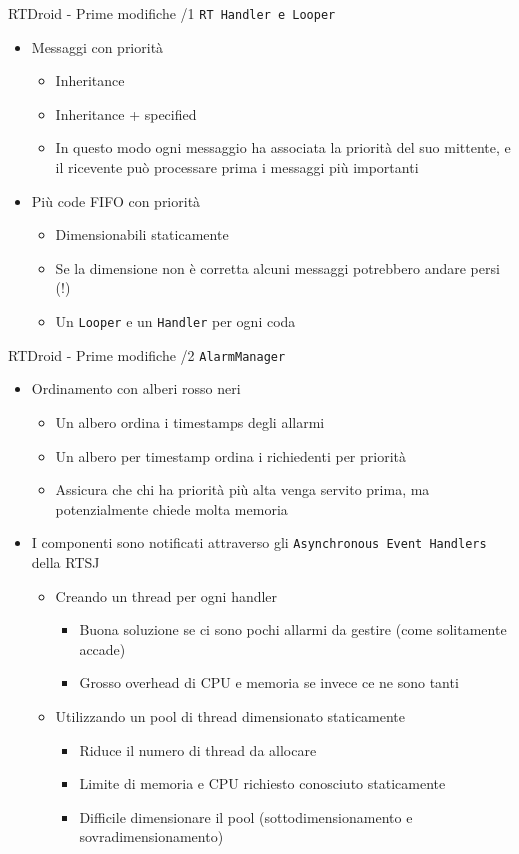 \begin{frame}{RTDroid - Prime modifiche /1}
	\texttt{RT Handler e Looper}
	\begin{itemize}
		\item Messaggi con priorità
		\begin{itemize}
			\item Inheritance
			\item Inheritance + specified
			\item In questo modo ogni messaggio ha associata la priorità del suo mittente, e il ricevente può processare prima i messaggi più importanti
		\end{itemize}
		\item Più code FIFO con priorità
		\begin{itemize}
			\item Dimensionabili staticamente 
			\item Se la dimensione non è corretta alcuni messaggi potrebbero andare persi (!)
			\item Un \texttt{Looper} e un \texttt{Handler} per ogni coda
		\end{itemize}
	\end{itemize}
\end{frame}
\begin{frame}{RTDroid - Prime modifiche /2}
	\texttt{AlarmManager}
	\begin{itemize}
		\item Ordinamento con alberi rosso neri
		\begin{itemize}
			\item Un albero ordina i timestamps degli allarmi
			\item Un albero per timestamp ordina i richiedenti per priorità
			\item Assicura che chi ha priorità più alta venga servito prima, ma potenzialmente chiede molta memoria
		\end{itemize}
		\item I componenti sono notificati attraverso gli \texttt{Asynchronous Event Handlers} della RTSJ
		\begin{itemize}
			\item Creando un thread per ogni handler
			\begin{itemize}
				\item Buona soluzione se ci sono pochi allarmi da gestire (come solitamente accade)
				\item Grosso overhead di CPU e memoria se invece ce ne sono tanti
			\end{itemize}
			\item Utilizzando un pool di thread dimensionato staticamente
			\begin{itemize}
				\item Riduce il numero di thread da allocare
				\item Limite di memoria e CPU richiesto conosciuto staticamente
				\item Difficile dimensionare il pool (sottodimensionamento e sovradimensionamento)
			\end{itemize}
		\end{itemize}
	\end{itemize}
\end{frame}
